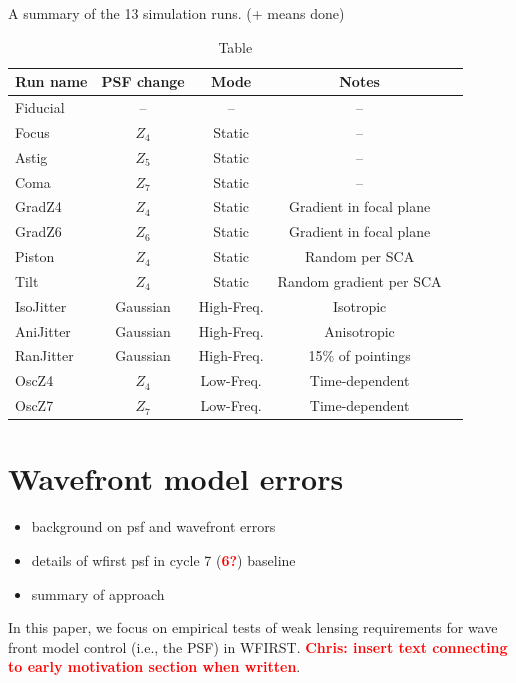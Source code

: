 \documentclass[aps,prd, amsmath,amssymb,superscriptaddress,showkeys,nofootinbib,reprint,preprintnumbers]{revtex4-1}
\newcommand{\verify}[1]{\textcolor{red}{\textbf{{#1}}}}
\begin{document}
\def\arraystretch{1.4}
\setlength{\tabcolsep}{4pt}
\begin{table}
\caption{Table} A summary of the 13 simulation runs. (+ means done)
\label{table:values}
\begin{center}
\begin{tabular}{lcccc }
\hline
\hline
Run name & PSF change & Mode & Notes \\ 
\hline
Fiducial              & -- & -- & -- \\
Focus                & $Z_4$ & Static & --  \\
Astig                  & $Z_5$ & Static &  -- \\
Coma                & $Z_7$ & Static &  -- \\
GradZ4             & $Z_4$ & Static & Gradient in focal plane  \\
GradZ6              & $Z_6$ & Static &Gradient in focal plane    \\
Piston 		 & $Z_4$ & Static  &Random per SCA   \\
Tilt 			 & $Z_4$ & Static & Random gradient per SCA \\
IsoJitter 		& Gaussian  & High-Freq. & Isotropic  \\
AniJitter 		 & Gaussian & High-Freq. & Anisotropic  \\
RanJitter 		 & Gaussian & High-Freq. & 15\% of pointings  \\
OscZ4 		 & $Z_4$ & Low-Freq. & Time-dependent  \\
OscZ7 		 & $Z_7$ & Low-Freq. & Time-dependent  \\
\hline
\hline
\end{tabular}
\end{center}
\end{table}


\section{Wavefront model errors}\label{sec:results}

\begin{itemize}
\item background on psf and wavefront errors
\item details of wfirst psf in cycle 7 (\verify{6?}) baseline
\item summary of approach 
\end{itemize}

In this paper, we focus on empirical tests of weak lensing requirements for wave front model control (i.e., the PSF) in WFIRST. \verify{Chris: insert text connecting to early motivation section when written}. 
\end{document}

